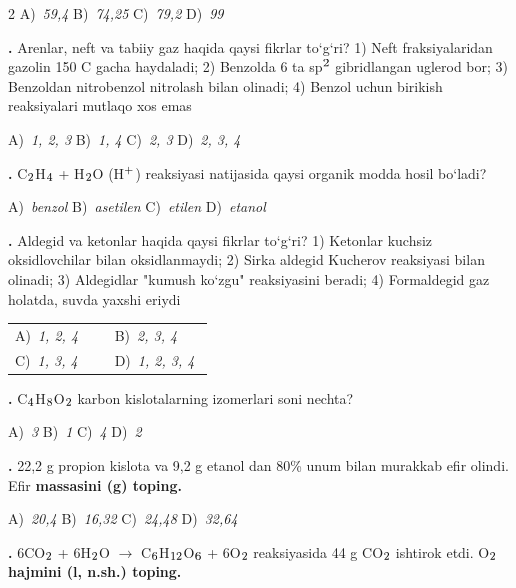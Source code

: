 \documentclass[11pt,a4paper]{article}
\renewcommand{\textsubscript}[1]{\ensuremath{_{\text{\fontsize{8}{8}\selectfont #1}}}}
\renewcommand{\textsuperscript}[1]{\ensuremath{^{\text{\fontsize{8}{8}\selectfont #1}}}}
\newcommand{\qn}[1]{\textbf{\fontsize{11.5}{13}\selectfont #1}}
\newcommand{\qsep}{\par\vspace{1pt}\noindent\rule{0pt}{0.4pt}\par\vspace{5pt}}
\begin{document}
\begin{multicols}{2}
\noindent A)~\textsl{59,4} \hfill B)~\textsl{74,25} \hfill C)~\textsl{79,2} \hfill D)~\textsl{99}\par
\qsep
\noindent\qn{22.} Arenlar, neft va tabiiy gaz haqida qaysi fikrlar to`g`ri? 1) Neft fraksiyalaridan gazolin 150 \textdegree{}C gacha haydaladi; 2) Benzolda 6 ta sp\textsuperscript{2} gibridlangan uglerod bor; 3) Benzoldan nitrobenzol nitrolash bilan olinadi; 4) Benzol uchun birikish reaksiyalari mutlaqo xos emas

\noindent A)~\textsl{1, 2, 3} \hfill B)~\textsl{1, 4} \hfill C)~\textsl{2, 3} \hfill D)~\textsl{2, 3, 4}\par
\qsep
\noindent\qn{23.} C\textsubscript{2}H\textsubscript{4} + H\textsubscript{2}O (H\textsuperscript{+}) reaksiyasi natijasida qaysi organik modda hosil bo`ladi?

\noindent A)~\textsl{benzol} \hfill B)~\textsl{asetilen} \hfill C)~\textsl{etilen} \hfill D)~\textsl{etanol}\par
\qsep
\noindent\qn{24.} Aldegid va ketonlar haqida qaysi fikrlar to`g`ri? 1) Ketonlar kuchsiz oksidlovchilar bilan oksidlanmaydi; 2) Sirka aldegid Kucherov reaksiyasi bilan olinadi; 3) Aldegidlar "kumush ko`zgu" reaksiyasini beradi; 4) Formaldegid gaz holatda, suvda yaxshi eriydi

\noindent\begin{tabular}{@{}p{0.47\linewidth}@{}p{0.47\linewidth}@{}}
A)~\textsl{1, 2, 4} & B)~\textsl{2, 3, 4} \\
C)~\textsl{1, 3, 4} & D)~\textsl{1, 2, 3, 4} \\
\end{tabular}\par
\qsep
\noindent\qn{25.} C\textsubscript{4}H\textsubscript{8}O\textsubscript{2} karbon kislotalarning izomerlari soni nechta?

\noindent A)~\textsl{3} \hfill B)~\textsl{1} \hfill C)~\textsl{4} \hfill D)~\textsl{2}\par
\qsep
\noindent\qn{26.} 22,2 g propion kislota va 9,2 g etanol dan 80\% unum bilan murakkab efir olindi. Efir \textbf{massasini (g) toping.}

\noindent A)~\textsl{20,4} \hfill B)~\textsl{16,32} \hfill C)~\textsl{24,48} \hfill D)~\textsl{32,64}\par
\qsep
\noindent\qn{27.} 6CO\textsubscript{2} + 6H\textsubscript{2}O $\to$ C\textsubscript{6}H\textsubscript{12}O\textsubscript{6} + 6O\textsubscript{2} reaksiyasida 44 g CO\textsubscript{2} ishtirok etdi. O\textsubscript{2} \textbf{hajmini (l, n.sh.) toping.}


\end{multicols}
\end{document}
